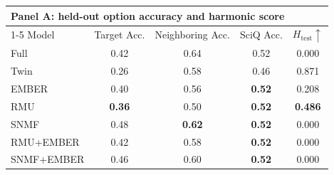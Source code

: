 \begin{table}[h]
  \centering
  \scriptsize
  \begin{tabular}{lcccc}
    \toprule
    \multicolumn{5}{l}{\textbf{Panel A: held-out option accuracy and harmonic score}} \\
    \cmidrule(lr){1-5}
    Model & Target Acc. & Neighboring Acc. & SciQ Acc. & $H_{\mathrm{test}}\uparrow$ \\
    \midrule
    Full  & 0.42 & 0.64 & 0.52 & 0.000 \\
    Twin  & 0.26 & 0.58 & 0.46 & 0.871 \\
    EMBER & 0.40 & 0.56 & \textbf{0.52} & 0.208 \\
    RMU   & \textbf{0.36} & 0.50 & \textbf{0.52} & \textbf{0.486} \\
    SNMF  & 0.48 & \textbf{0.62} & \textbf{0.52} & 0.000 \\
    RMU+EMBER & 0.42 & 0.58 & \textbf{0.52} & 0.000 \\
    SNMF+EMBER & 0.46 & 0.60 & \textbf{0.52} & 0.000 \\
    \bottomrule
  \end{tabular}


\end{table}
